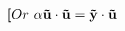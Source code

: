 \documentclass[preview]{standalone}
\begin{document}
\begin{align*}
{\textbf[Or} \,\, \mathbf{\alpha} \mathbf{\vec{u}} \cdot \mathbf{\vec{u}}= \mathbf{\vec{y}} \cdot \mathbf{\vec{u}}
\end{align*}
\end{document}
